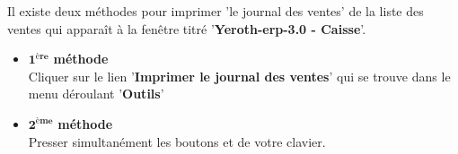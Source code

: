 Il existe deux m\'ethodes pour imprimer 'le journal
des ventes' de la liste des ventes qui appara\^it \`a
la fen\^etre titr\'e '\textbf{Yeroth-erp-3.0 - Caisse}'.

\begin{itemize}[]
	\item \textcolor{purplish}{$\mathbf{1^{\text{\`ere}}}$ \textbf{m\'ethode}}\\
		Cliquer sur le lien '\textbf{Imprimer le journal des
		ventes}' qui se trouve dans le menu
		d\'eroulant '\textbf{Outils}'\\

	\item \textcolor{purplish}{$\mathbf{2^{\text{\`eme}}}$ \textbf{m\'ethode}}\\
		Presser simultan\'ement les boutons 
		et  de votre clavier.
\end{itemize}
